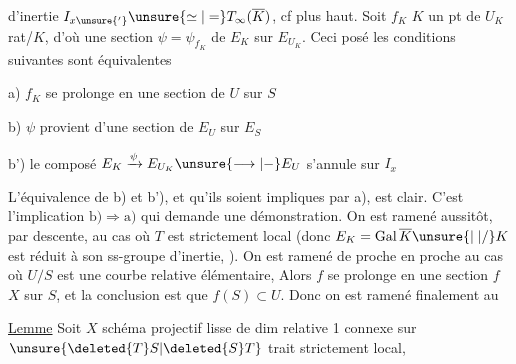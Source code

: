 d'inertie $I_{x\unsure{'}}\unsure{\simeq|=}T_\infty(\overline K)$, cf plus haut. Soit $f_K$ $K$ un pt de $U_K$ rat/$K$, d'où une section $\psi=\psi_{f_K}$ de $E_K$ sur $E_{U_K}$. Ceci posé les conditions suivantes sont équivalentes

\noindent a) $f_K$ se prolonge en une section de $U$ sur $S$

\noindent b) $\psi$ provient d'une section de $E_U$ sur $E_S$

\noindent b') le composé $E_K\xrightarrow{\psi}E_{U_K}\unsure{\longrightarrow|-}E_U$ s'annule sur $I_x$


L'équivalence de b) et b'), et qu'ils soient impliques par a), est clair. C'est l'implication $\mathrm{b)}\Longrightarrow\mathrm{a)}$ qui demande une démonstration. On est ramené aussitôt, par descente, au cas  où $T$ est strictement local (donc $E_K=\operatorname{Gal}\overline K\unsure{\mid|/}K$ est réduit à son ss-groupe d'inertie, ). On est ramené de proche en proche au cas où $U/S$ est une courbe relative élémentaire,   \unsure{\deleted{,}|,}  Alors $f$ se prolonge en une section $f$   $X$ sur $S$, et la conclusion est que $f(S)\subset U$. Donc on est ramené finalement au

\uline{Lemme} Soit $X$ schéma projectif lisse de dim relative 1 connexe sur $\unsure{\deleted{T}S|\deleted{S}T}$ trait strictement local,
